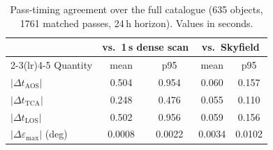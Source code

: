 \begin{table}[t]
\caption{Pass-timing agreement over the full catalogue (635 objects, 1761 matched passes, 24\,h horizon). Values in seconds.}
\label{tab:accuracy}
\centering
\begin{tabular}{lcccc}
\toprule
& \multicolumn{2}{c}{vs.\ 1\,s dense scan} & \multicolumn{2}{c}{vs.\ Skyfield} \\
\cmidrule(lr){2-3}\cmidrule(lr){4-5}
Quantity & mean & p95 & mean & p95 \\
\midrule
$|\Delta t_\mathrm{AOS}|$ & 0.504 & 0.954 & 0.060 & 0.157 \\
$|\Delta t_\mathrm{TCA}|$ & 0.248 & 0.476 & 0.055 & 0.110 \\
$|\Delta t_\mathrm{LOS}|$ & 0.502 & 0.956 & 0.059 & 0.156 \\
$|\Delta \varepsilon_\mathrm{max}|$ (deg) & 0.0008 & 0.0022 & 0.0034 & 0.0102 \\
\bottomrule
\end{tabular}
\end{table}
